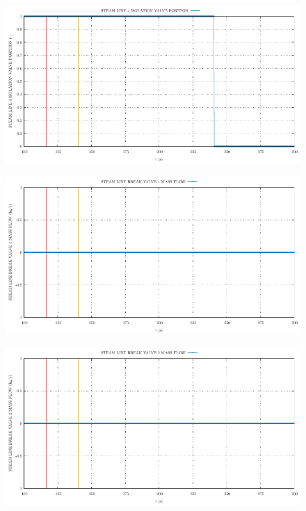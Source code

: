 \documentclass{article}
\begin{document}
\begin{multicols}{2}
\begin{figure}[H]
\end{figure}
\begin{figure}[H]
\centering
\includegraphics[width=\linewidth]{./graphs/STEAM LINE 4 ISOLATION VALVE POSITION_comp.pdf}
\end{figure}
\begin{figure}[H]
\centering
\includegraphics[width=\linewidth]{./graphs/STEAM LINE BREAK VALVE 1 MASS FLOW_comp.pdf}
\end{figure}
\begin{figure}[H]
\centering
\includegraphics[width=\linewidth]{./graphs/STEAM LINE BREAK VALVE 2 MASS FLOW_comp.pdf}
\end{figure}
\end{multicols}
\end{document}
